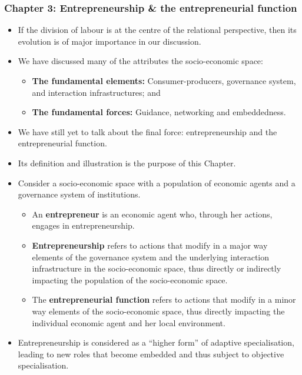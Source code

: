\documentclass[10pt]{beamer}
\begin{document}
\begin{frame} \frametitle{Chapter 3: Entrepreneurship \& the entrepreneurial function}
\begin{itemize}
\item If the division of labour is at the centre of the relational perspective, then its evolution is of major importance in our discussion.
\medskip
\item We have discussed many of the attributes the socio-economic space:
\begin{itemize}
\medskip
\item \textbf{The fundamental elements:} Consumer-producers, governance system, and interaction infrastructures; and
\medskip
\item \textbf{The fundamental forces:} Guidance, networking and embeddedness.
\end{itemize}
\medskip
\item We have still yet to talk about the final force: entrepreneurship and the entrepreneurial function.
\medskip
\item Its definition and illustration is the purpose of this Chapter.
\end{itemize}
\end{frame}


\begin{frame}
\begin{itemize}
\item Consider a socio-economic space with a population of economic agents and a governance system of institutions.
\begin{itemize}
\medskip
\item An \textbf{entrepreneur} is an economic agent who, through her actions, engages in entrepreneurship.
\medskip
\item \textbf{Entrepreneurship} refers to actions that modify in a major way elements of the governance system and the underlying interaction infrastructure in the socio-economic space, thus directly or indirectly impacting the population of the socio-economic space.
\medskip
\item The \textbf{entrepreneurial function} refers to actions that modify in a minor way elements of the socio-economic space, thus directly impacting the individual economic agent and her local environment.
\end{itemize}
\medskip
\item Entrepreneurship is considered as a ``higher form'' of adaptive specialisation, leading to new roles that become embedded and thus subject to objective specialisation.
\end{itemize}
\end{frame}
\end{document}

